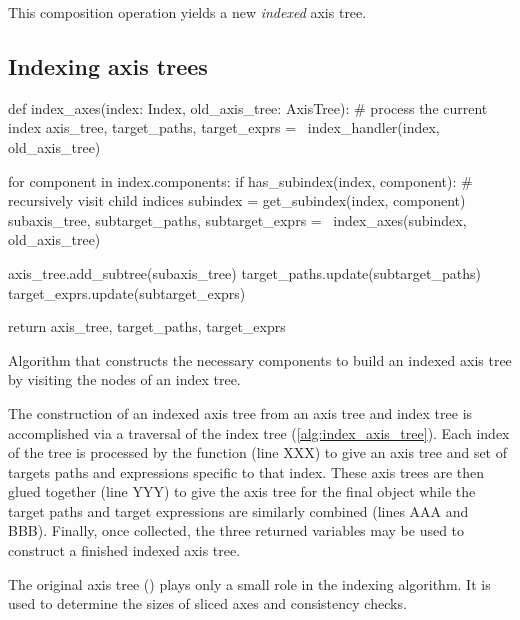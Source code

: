 \documentclass[thesis]{subfiles}
\begin{document}
This composition operation yields a new \textit{indexed} axis tree.


\subsection{Indexing axis trees}

\begin{algorithm}
  \begin{pyalg2}
    def index_axes(index: Index, old_axis_tree: AxisTree):
      # process the current index
      axis_tree, target_paths, target_exprs = \
        index_handler(index, old_axis_tree)

      for component in index.components:
        if has_subindex(index, component):
          # recursively visit child indices
          subindex = get_subindex(index, component)
          subaxis_tree, subtarget_paths, subtarget_exprs = \
            index_axes(subindex, old_axis_tree)

          axis_tree.add_subtree(subaxis_tree)
          target_paths.update(subtarget_paths)
          target_exprs.update(subtarget_exprs)

      return axis_tree, target_paths, target_exprs
  \end{pyalg2}

  \caption{
    Algorithm that constructs the necessary components to build an indexed axis tree by visiting the nodes of an index tree.
  }
  \label{alg:index_axis_tree}
\end{algorithm}

The construction of an indexed axis tree from an axis tree and index tree is accomplished via a traversal of the index tree (\cref{alg:index_axis_tree}).
Each index of the tree is processed by the function  (line XXX) to give an axis tree and set of targets paths and expressions specific to that index.
These axis trees are then glued together (line YYY) to give the axis tree for the final object while the target paths and target expressions are similarly combined (lines AAA and BBB).
Finally, once collected, the three returned variables may be used to construct a finished indexed axis tree.

The original axis tree (\pycode{old_axis_tree}) plays only a small role in the indexing algorithm.
It is used to determine the sizes of sliced axes and consistency checks.
\end{document}
